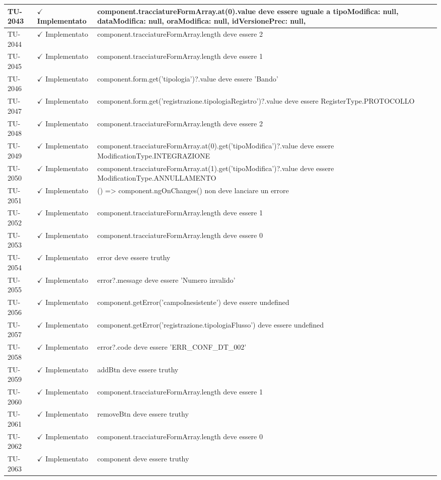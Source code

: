 ﻿\documentclass[a4paper,12pt]{article}
\newcommand{\ok}{\textcolor{green!60!black}{$\checkmark$ Implementato}}
\begin{document}
\begin{longtable}{|p{2cm}|p{3.5cm}|p{9.5cm}|}
\hline
TU-2043 & \ok & component.tracciatureFormArray.at(0).value deve essere uguale a { tipoModifica: null, dataModifica: null, oraModifica: null, idVersionePrec: null, } \\
\hline
TU-2044 & \ok & component.tracciatureFormArray.length deve essere 2 \\
\hline
TU-2045 & \ok & component.tracciatureFormArray.length deve essere 1 \\
\hline
TU-2046 & \ok & component.form.get('tipologia')?.value deve essere 'Bando' \\
\hline
TU-2047 & \ok & component.form.get('registrazione.tipologiaRegistro')?.value deve essere RegisterType.PROTOCOLLO \\
\hline
TU-2048 & \ok & component.tracciatureFormArray.length deve essere 2 \\
\hline
TU-2049 & \ok & component.tracciatureFormArray.at(0).get('tipoModifica')?.value deve essere ModificationType.INTEGRAZIONE \\
\hline
TU-2050 & \ok & component.tracciatureFormArray.at(1).get('tipoModifica')?.value deve essere ModificationType.ANNULLAMENTO \\
\hline
TU-2051 & \ok & () => component.ngOnChanges({}) non deve lanciare un errore \\
\hline
TU-2052 & \ok & component.tracciatureFormArray.length deve essere 1 \\
\hline
TU-2053 & \ok & component.tracciatureFormArray.length deve essere 0 \\
\hline
TU-2054 & \ok & error deve essere truthy \\
\hline
TU-2055 & \ok & error?.message deve essere 'Numero invalido' \\
\hline
TU-2056 & \ok & component.getError('campoInesistente') deve essere undefined \\
\hline
TU-2057 & \ok & component.getError('registrazione.tipologiaFlusso') deve essere undefined \\
\hline
TU-2058 & \ok & error?.code deve essere 'ERR\_CONF\_DT\_002' \\
\hline
TU-2059 & \ok & addBtn deve essere truthy \\
\hline
TU-2060 & \ok & component.tracciatureFormArray.length deve essere 1 \\
\hline
TU-2061 & \ok & removeBtn deve essere truthy \\
\hline
TU-2062 & \ok & component.tracciatureFormArray.length deve essere 0 \\
\hline
TU-2063 & \ok & component deve essere truthy \\

\end{longtable}
\end{document}
